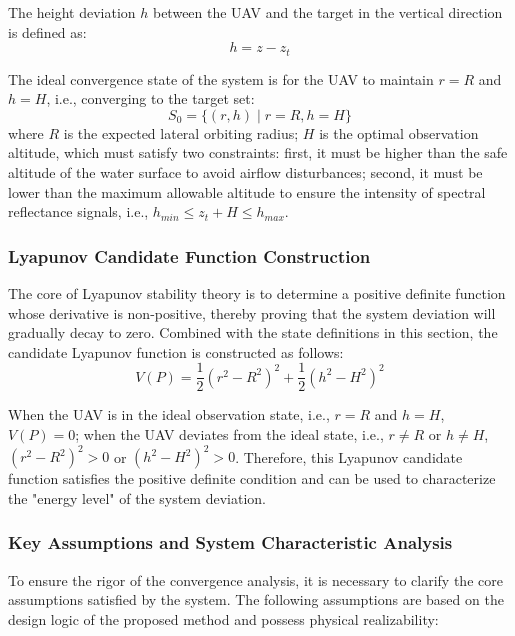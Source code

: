 \documentclass[final,3p,times,numbers]{elsarticle}
\begin{document}
The height deviation $h$ between the UAV and the target in the vertical direction is defined as:
\begin{equation}
h = z - z_t \label{eq:3-19}
\end{equation}

The ideal convergence state of the system is for the UAV to maintain $r=R$ and $h=H$, i.e., converging to the target set:
\begin{equation}
S_0 = \{(r,h) \mid r=R, h=H\} \label{eq:3-20}
\end{equation}
where $R$ is the expected lateral orbiting radius; $H$ is the optimal observation altitude, which must satisfy two constraints: first, it must be higher than the safe altitude of the water surface to avoid airflow disturbances; second, it must be lower than the maximum allowable altitude to ensure the intensity of spectral reflectance signals, i.e., $h_{min} \le z_t+H \le h_{max}$.

\subsubsection{Lyapunov Candidate Function Construction}
The core of Lyapunov stability theory is to determine a positive definite function whose derivative is non-positive, thereby proving that the system deviation will gradually decay to zero. Combined with the state definitions in this section, the candidate Lyapunov function is constructed as follows:
\begin{equation}
V(P) = \frac{1}{2}(r^2 - R^2)^2 + \frac{1}{2}(h^2 - H^2)^2 \label{eq:3-21}
\end{equation}

When the UAV is in the ideal observation state, i.e., $r=R$ and $h=H$, $V(P) = 0$; when the UAV deviates from the ideal state, i.e., $r \neq R$ or $h \neq H$, $(r^2 - R^2)^2 > 0$ or $(h^2 - H^2)^2 > 0$. Therefore, this Lyapunov candidate function satisfies the positive definite condition and can be used to characterize the "energy level" of the system deviation.

\subsubsection{Key Assumptions and System Characteristic Analysis}
To ensure the rigor of the convergence analysis, it is necessary to clarify the core assumptions satisfied by the system. The following assumptions are based on the design logic of the proposed method and possess physical realizability:
\end{document}
